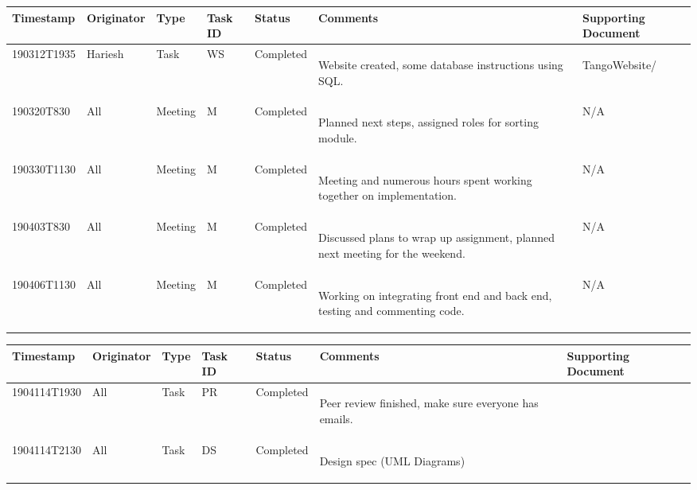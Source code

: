 \documentclass[12pt]{article}
\begin{document}
\begin{center}
\begin{tabular}{ | m{2.3cm} | m{1.8cm} | m{1.5cm} | m{1.2cm} | m{2cm} | m{3cm} | m{2.7cm} | } 
\hline
\textbf{Timestamp} & \textbf{Originator} & \textbf{Type} & \textbf{Task ID} & \textbf{Status} & \textbf{Comments} & \textbf{Supporting Document} \\
\hline
190312T1935 & Hariesh & Task & WS & Completed & \begin{center}Website created, some database instructions using SQL. \end{center} & \begin{center}TangoWebsite/ \end{center} \\ 
\hline
190320T830 & All & Meeting & M & Completed & \begin{center} Planned next steps, assigned roles for sorting module. \end{center} & N/A \\
\hline
190330T1130 & All & Meeting & M & Completed & \begin{center}Meeting and numerous hours spent working together on implementation. \end{center} & N/A \\
\hline
190403T830 & All & Meeting & M & Completed & \begin{center}Discussed plans to wrap up assignment, planned next meeting for the weekend.\end{center} & N/A \\
\hline
190406T1130 & All & Meeting & M & Completed & \begin{center}Working on integrating front end and back end, testing and commenting code.\end{center} & N/A \\
\hline
\end{tabular}
\end{center}

\begin{center}
\begin{tabular}{ | m{2.3cm} | m{1.8cm} | m{1.5cm} | m{1.2cm} | m{2cm} | m{3cm} | m{2.7cm} | } 
\hline
\textbf{Timestamp} & \textbf{Originator} & \textbf{Type} & \textbf{Task ID} & \textbf{Status} & \textbf{Comments} & \textbf{Supporting Document} \\
\hline
1904114T1930 & All & Task & PR & Completed & \begin{center}Peer review finished, make sure everyone has emails.\end{center} & \begin{center} \end{center} \\ 
\hline
1904114T2130 & All & Task & DS & Completed & \begin{center}Design spec (UML Diagrams)\end{center} & \begin{center} \end{center} \\ 
\hline
\end{tabular}
\end{center}
\end{document}

